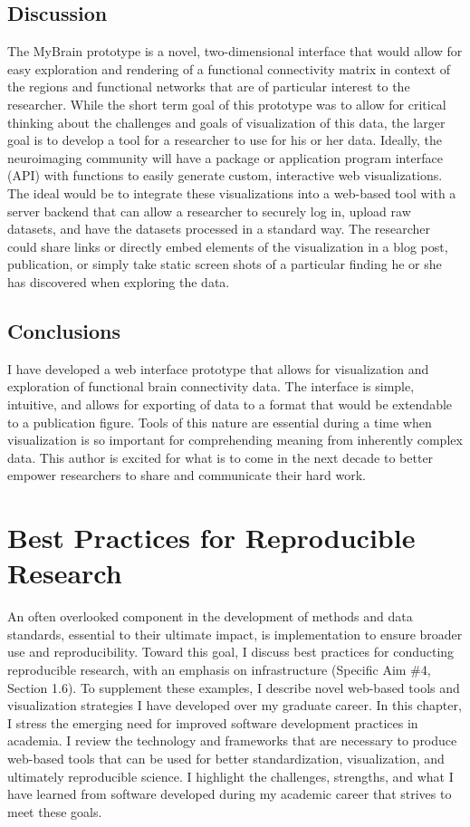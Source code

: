 \documentclass{report}
\begin{document}
\section{Discussion}
The MyBrain prototype is a novel, two-dimensional interface that would allow for easy exploration and rendering of a functional connectivity matrix in context of the regions and functional networks that are of particular interest to the researcher.  While the short term goal of this prototype was to allow for critical thinking about the challenges and goals of visualization of this data, the larger goal is to develop a tool for a researcher to use for his or her data.  Ideally, the neuroimaging community will have a package or application program interface (API) with functions to easily generate custom, interactive web visualizations.  The ideal would be to integrate these visualizations into a web-based tool with a server backend that can allow a researcher to securely log in, upload raw datasets, and have the datasets processed in a standard way. The researcher could share links or directly embed elements of the visualization in a blog post, publication, or simply take static screen shots of a particular finding he or she has discovered when exploring the data.  

\section{Conclusions}
I have developed a web interface prototype that allows for visualization and exploration of functional brain connectivity data.  The interface is simple, intuitive, and allows for exporting of data to a format that would be extendable to a publication figure.  Tools of this nature are essential during a time when visualization is so important for comprehending meaning from inherently complex data.  This author is excited for what is to come in the next decade to better empower researchers to share and communicate their hard work.

\chapter{Best Practices for Reproducible Research}

An often overlooked component in the development of methods and data
standards, essential to their ultimate impact, is implementation to
ensure broader use and reproducibility. Toward this goal, I discuss best
practices for conducting reproducible research, with an emphasis on
infrastructure (Specific Aim \#4, Section 1.6). To supplement these
examples, I describe novel web-based tools and visualization strategies
I have developed over my graduate career. In this chapter, I stress the
emerging need for improved software development practices in academia. I
review the technology and frameworks that are necessary to produce
web-based tools that can be used for better standardization,
visualization, and ultimately reproducible science. I highlight the
challenges, strengths, and what I have learned from software developed
during my academic career that strives to meet these goals.
\end{document}
